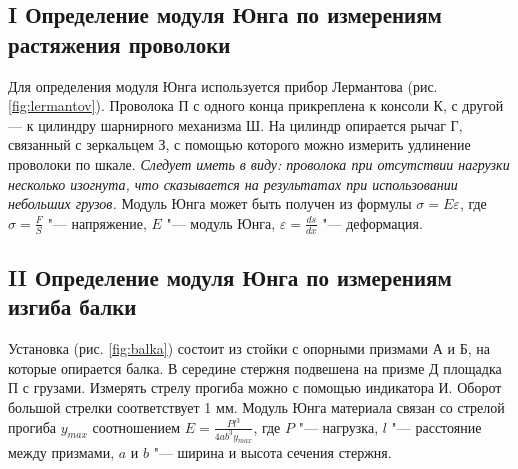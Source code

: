 \documentclass[a4paper, 10pt]{article}
\renewcommand{\epsilon}{\varepsilon}
\begin{document}
		\subsection*{I Определение модуля Юнга по измерениям растяжения проволоки}
			Для определения модуля Юнга используется прибор Лермантова (рис. \ref{fig:lermantov}). Проволока П с одного конца прикреплена к консоли К, с другой --- к цилиндру шарнирного механизма Ш. На цилиндр опирается рычаг Г, связанный с зеркальцем З, с помощью которого можно измерить удлинение проволоки по шкале. \textit{Следует иметь в виду: проволока при отсутствии нагрузки несколько изогнута, что сказывается на результатах при использовании небольших грузов.}
			Модуль Юнга может быть получен из формулы $\sigma = E \epsilon$, где $\sigma = \frac{F}{S}$ "--- напряжение, $E$ "--- модуль Юнга, $\epsilon = \frac{ds}{dx}$ "--- деформация.
		
		\subsection*{II Определение модуля Юнга по измерениям изгиба балки}
			Установка (рис. \ref{fig:balka}) состоит из стойки с опорными призмами А и Б, на которые опирается балка. В середине стержня подвешена на призме Д площадка П с грузами. Измерять стрелу прогиба можно с помощью индикатора И. Оборот большой стрелки соответствует 1 мм.
			Модуль Юнга материала связан со стрелой прогиба $y_{max}$ соотношением $E = \frac{Pl^3}{4ab^3 y_{max}}$, где $P$ "--- нагрузка, $l$ "--- расстояние между призмами, $a$ и $b$ "--- ширина и высота сечения стержня.
		
\end{document}
